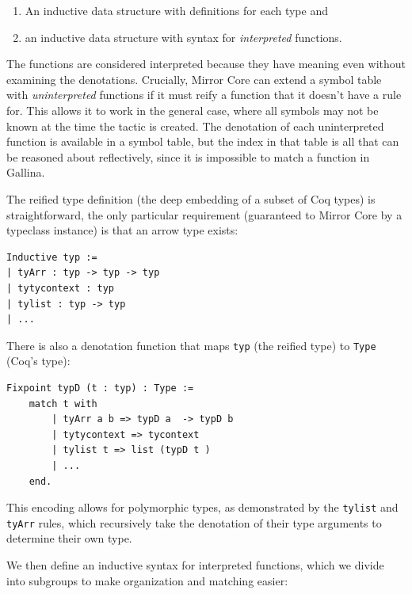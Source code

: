 \documentclass{puthesis}
\begin{document}
\begin{enumerate}
\item An inductive data structure with definitions for each type and
\item an inductive data structure with syntax for \emph{interpreted}
  functions.
\end{enumerate}

The functions are considered interpreted because they have meaning even without
examining the denotations. Crucially, Mirror Core can extend a symbol
table with \emph{uninterpreted} functions if it must reify a function
that it doesn't have a rule for. This allows it to work in the general
case, where all symbols may not be known at the time the tactic is
created. The denotation of each uninterpreted function is available in
a symbol table, but the index in that table is all that can be
reasoned about reflectively, since it is impossible to match a
function in Gallina.

The reified type definition (the deep embedding of a subset of Coq
types) is straightforward, the only particular requirement (guaranteed
to Mirror Core by a typeclass instance) is that an arrow type exists:

\begin{lstlisting}
Inductive typ :=
| tyArr : typ -> typ -> typ
| tytycontext : typ
| tylist : typ -> typ
| ...
\end{lstlisting}

There is also a denotation function that maps \lstinline|typ| (the
reified type) to \lstinline|Type| (Coq's type):

\begin{lstlisting} 
Fixpoint typD (t : typ) : Type :=
    match t with
        | tyArr a b => typD a  -> typD b
        | tytycontext => tycontext
        | tylist t => list (typD t )
        | ...
    end.
\end{lstlisting}

This encoding allows for polymorphic types, as demonstrated by the
\lstinline|tylist| and \lstinline|tyArr| rules, which recursively take
the denotation of their type arguments to determine their own type.

We then define an inductive syntax for interpreted functions, which we
divide into subgroups to make organization and matching easier:
\end{document}
